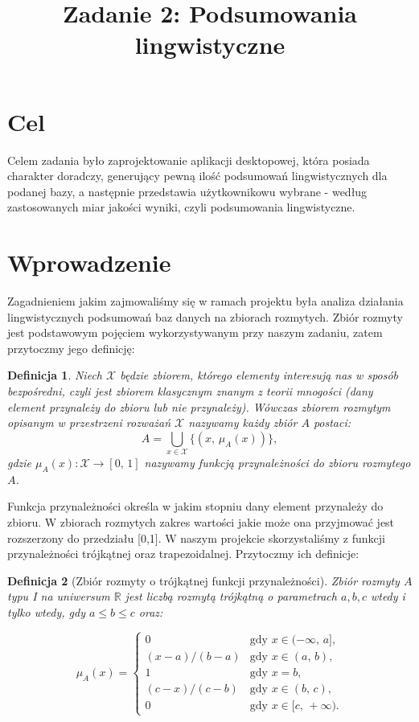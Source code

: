 \documentclass{classrep}
\author{
\studentinfo{Justyna Hubert}{210200} \and
\studentinfo{Karol Podlewski}{210294}
}
\title{Zadanie 2: Podsumowania lingwistyczne}
\newtheorem{definition}{Definicja}
\begin{document}
\maketitle

\section{Cel}
Celem zadania było zaprojektowanie aplikacji desktopowej, która posiada charakter doradczy, generujący pewną ilość podsumowań lingwistycznych dla podanej bazy, a następnie przedstawia użytkownikowu wybrane - według zastosowanych miar jakości wyniki, czyli podsumowania lingwistyczne.

\section{Wprowadzenie}	
Zagadnieniem jakim zajmowaliśmy się w ramach projektu była analiza działania lingwistycznych podsumowań baz danych na zbiorach rozmytych. Zbiór rozmyty jest podstawowym pojęciem wykorzystywanym przy naszym zadaniu, zatem przytoczmy jego definicję:

\begin{definition}
Niech \(\mathcal{X}\) będzie zbiorem, którego elementy interesują
nas w sposób bezpośredni, czyli jest zbiorem klasycznym znanym z teorii mnogości (dany element przynależy do zbioru lub nie przynależy).
Wówczas \emph{zbiorem rozmytym opisanym w przestrzeni rozważań \(\mathcal{X}\)}
nazywamy każdy zbiór \(A\) postaci:
\[A = \bigcup_{x \in \mathcal{X}} \{(x,\, \mu_A(x))\},\]
gdzie \(\mu_A(x) : \mathcal{X} \to [0,\,1]\) nazywamy \emph{funkcją
przynależności do zbioru rozmytego \(A\)}.
\end{definition}

Funkcja przynależności określa w jakim stopniu dany element przynależy do zbioru. W zbiorach rozmytych zakres wartości jakie może ona przyjmować jest rozszerzony do przedziału [0,1].
W naszym projekcie skorzystaliśmy z funkcji przynależności trójkątnej oraz trapezoidalnej. Przytoczmy ich definicje:

\begin{definition}[Zbiór rozmyty o trójkątnej funkcji przynależności]
Zbiór rozmyty \(A\) typu I na uniwersum \(\mathbb{R}\) jest
\emph{liczbą rozmytą trójkątną o parametrach \(a, b, c\)} wtedy i tylko
wtedy, gdy \(a \leq b \leq c\) oraz:

\[\mu_A(x) = \begin{cases}
0                 & \mbox{gdy } x \in (-\infty,\, a], \\
(x - a) / (b - a) & \mbox{gdy } x \in (a,\, b), \\
1                 & \mbox{gdy } x = b, \\
(c - x) / (c - b) & \mbox{gdy } x \in (b,\, c), \\
0                 & \mbox{gdy } x \in [c,\, +\infty).
\end{cases}\]
\end{definition}
\end{document}
